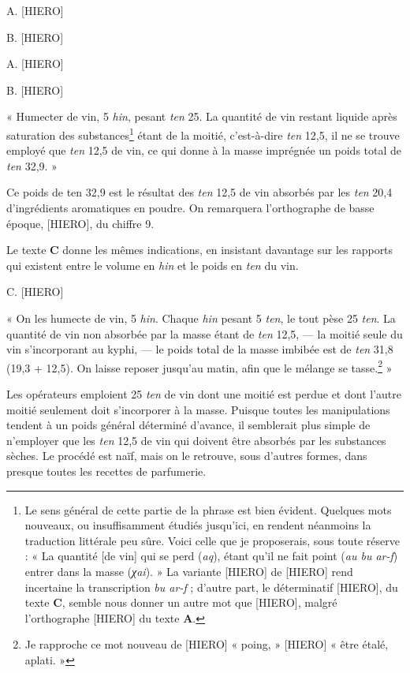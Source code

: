 \documentclass[a4paper, 11pt, oneside]{article}
\begin{document}
A. [HIERO]

B. [HIERO]

A. [HIERO]

B. [HIERO]

« Humecter de vin, 5 \emph{hin}, pesant \emph{ten} 25. La quantité de vin restant liquide après saturation des substances\footnote{Le sens général de cette partie de la phrase est bien évident. Quelques mots nouveaux, ou insuffisamment étudiés jusqu'ici, en rendent néanmoins la traduction littérale peu sûre. Voici celle que je proposerais, sous toute réserve : « La quantité [de vin] qui se perd (\emph{aq}), étant qu'il ne fait point (\emph{au bu ar-f}) entrer dans la masse (\emph{χai}). » La variante [HIERO] de [HIERO] rend incertaine la transcription \emph{bu ar-f} ; d'autre part, le déterminatif [HIERO], du texte \textbf{C}, semble nous donner un autre mot que [HIERO], malgré l'orthographe [HIERO] du texte \textbf{A}.} étant de la moitié, c'est-à-dire \emph{ten} 12,5, il ne se trouve employé que \emph{ten} 12,5 de vin, ce qui donne à la masse imprégnée un poids total de \emph{ten} 32,9. »

Ce poids de ten 32,9 est le résultat des \emph{ten} 12,5 de vin absorbés par les \emph{ten} 20,4 d'ingrédients aromatiques en poudre. On remarquera l'orthographe de basse époque, [HIERO], du chiffre 9.

Le texte \textbf{C} donne les mêmes indications, en insistant davantage sur les rapports qui existent entre le volume en \emph{hin} et le poids en \emph{ten} du vin.

C. [HIERO]

« On les humecte de vin, 5 \emph{hin}. Chaque \emph{hin} pesant 5 \emph{ten}, le tout pèse 25 \emph{ten}. La quantité de vin non absorbée par la masse étant de \emph{ten} 12,5, --- la moitié seule du vin s'incorporant au kyphi, --- le poids total de la masse imbibée est de \emph{ten} 31,8 (19,3 + 12,5). On laisse reposer jusqu'au matin, afin que le mélange se tasse.\footnote{Je rapproche ce mot nouveau de [HIERO] « poing, » [HIERO] « être étalé, aplati. »} »

Les opérateurs emploient 25 \emph{ten} de vin dont une moitié est perdue et dont l'autre moitié seulement doit s'incorporer à la masse. Puisque toutes les manipulations tendent à un poids général déterminé d'avance, il semblerait plus simple de n'employer que les \emph{ten} 12,5 de vin qui doivent être absorbés par les substances sèches. Le procédé est naïf, mais on le retrouve, sous d'autres formes, dans presque toutes les recettes de parfumerie.
\clearpage
\end{document}
